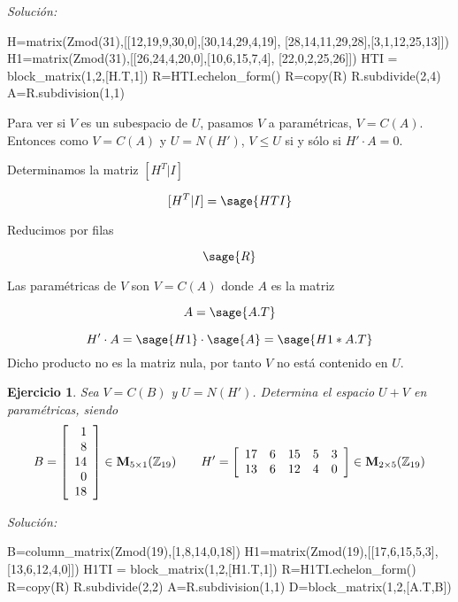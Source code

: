 \documentclass{amsart}
\newtheorem{ejer}{Ejercicio}
\begin{document}
{\it Soluci\'on:}

\begin{sageblock}
H=matrix(Zmod(31),[[12,19,9,30,0],[30,14,29,4,19],
[28,14,11,29,28],[3,1,12,25,13]])
H1=matrix(Zmod(31),[[26,24,4,20,0],[10,6,15,7,4],
[22,0,2,25,26]])
HTI = block_matrix(1,2,[H.T,1])
R=HTI.echelon_form()
R=copy(R)
R.subdivide(2,4)
A=R.subdivision(1,1)
\end{sageblock}

Para ver si $V$ es un subespacio de $U$, pasamos $V$ a paramétricas, $V=C(A)$. 
Entonces como $V=C(A)$ y $U=N(H')$, $V\leq U$ si y sólo si $H'\cdot A = 0$.

Determinamos la matriz $[H^T|I]$

$$ [H^T|I] =  \sage{HTI} $$

Reducimos por filas

$$ \sage{R} $$

Las paramétricas de $V$ son $V = C(A)$ donde $A$ es la matriz

$$ A = \sage{A.T} $$


$$ H'\cdot A = \sage{H1}\cdot \sage{A} = \sage{H1*A.T} $$ Dicho producto no es 
la matriz nula, por tanto $V$ no está contenido en $U$.



\begin{ejer} Sea $V = C(B)$ y $U = N(H')$. Determina el espacio $U+V$ en param\'etricas, siendo 
\[B = \left[\begin{array}{r}
1 \\
8 \\
14 \\
0 \\
18
\end{array}\right] \in {\bf M}_{5 \times 1}({\mathbb Z}_{19}) \qquad
H' = \left[\begin{array}{rrrrr}
17 & 6 & 15 & 5 & 3 \\
13 & 6 & 12 & 4 & 0
\end{array}\right] \in {\bf M}_{2 \times 5}({\mathbb Z}_{19}) \]
\end{ejer}

{\it Soluci\'on:}

\begin{sageblock}
B=column_matrix(Zmod(19),[1,8,14,0,18])
H1=matrix(Zmod(19),[[17,6,15,5,3],[13,6,12,4,0]])
H1TI = block_matrix(1,2,[H1.T,1])
R=H1TI.echelon_form()
R=copy(R)
R.subdivide(2,2)
A=R.subdivision(1,1)
D=block_matrix(1,2,[A.T,B])
\end{sageblock}
\end{document}
